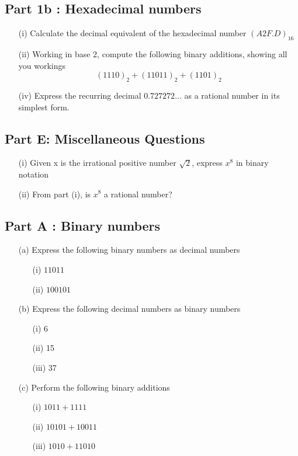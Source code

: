 \documentclass[]{report}
\begin{document}
\subsection*{Part 1b : Hexadecimal numbers}
\begin{itemize}
	\item[(i)] Calculate the decimal equivalent of the hexadecimal number $(A2F.D)_{16}$
	\item[(ii)] Working in base 2, compute the following binary additions, showing all you workings
	\[(1110)_2 + (11011)_2 + (1101)_2 \]
	\item[(iv)] Express the recurring decimal $0.727272\ldots$ as a rational number in its simplest form.
\end{itemize}




\subsection*{Part E: Miscellaneous Questions}
\begin{itemize}
	\item[(i)] Given x is the irrational positive number $\sqrt{2}$, express $x^8$ in binary notation\\
	\item[(ii)] From part (i), is $x^8$ a rational number?
\end{itemize}
\newpage

	\subsection*{Part A :  Binary numbers}
	\begin{itemize}
		\item[(a)] Express the following binary numbers as decimal numbers
		\begin{itemize}
			\item[(i)] $11011$
			\item[(ii)] $100101$
		\end{itemize}
		\item[(b)] Express the following decimal numbers as binary numbers
		\begin{itemize}
			\item[(i)] 6
			\item[(ii)] 15
			\item[(iii)] 37
		\end{itemize}
		\item[(c)] Perform the following binary additions
		\begin{itemize}
			\item[(i)] $1011+ 1111$
			\item[(ii)] $10101  + 10011$
			\item[(iii)] $1010 + 11010$
		\end{itemize}
		
	\end{itemize}
	
\end{document}
